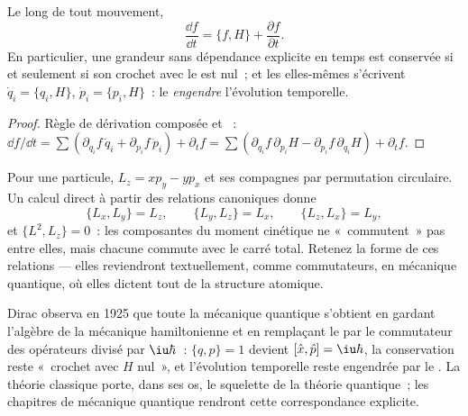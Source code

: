 \begin{theorem}\label{thm:b3:hamiltonian-mechanics:evolution}
Le long de tout mouvement,
\[
\frac{\dd f}{\dd t} = \{f, H\} + \frac{\partial f}{\partial t} .
\]
En particulier, une grandeur sans dépendance explicite en temps est
conservée si et seulement si son crochet avec le  est nul~;
et les  elles-mêmes s'écrivent $\dot q_i = \{q_i, H\}$, $\dot p_i
= \{p_i, H\}$~: le  \emph{engendre} l'évolution temporelle.
\end{theorem}

\begin{proof}
Règle de dérivation composée et ~: $\dd f/\dd t = \sum(
\partial_{q_i}f\,\dot q_i + \partial_{p_i}f\,\dot p_i) + \partial_tf =
\sum(\partial_{q_i}f\,\partial_{p_i}H - \partial_{p_i}f\,
\partial_{q_i}H) + \partial_tf$.
\end{proof}

\begin{example}\label{ex:b3:hamiltonian-mechanics:brackets}
Pour une particule, $L_z = xp_y - yp_x$ et ses compagnes par
permutation circulaire. Un calcul direct à partir des relations
canoniques donne
\[
\{L_x, L_y\} = L_z , \qquad
\{L_y, L_z\} = L_x , \qquad
\{L_z, L_x\} = L_y ,
\]
et $\{L^2, L_z\} = 0$~: les composantes du moment cinétique ne
«~commutent~» pas entre elles, mais chacune commute avec le carré
total. Retenez la forme de ces relations --- elles reviendront
textuellement, comme commutateurs, en mécanique quantique, où elles
dictent tout de la structure atomique.
\end{example}

\begin{remark}\label{rem:b3:hamiltonian-mechanics:doorway}
Dirac observa en 1925 que toute la mécanique quantique s'obtient en
gardant l'algèbre de la mécanique hamiltonienne et en remplaçant le
 par le commutateur des opérateurs divisé par
$\iu\hbar$~: $\{q, p\} = 1$ devient $[\hat x, \hat p] = \iu\hbar$, la
conservation reste «~crochet avec $H$ nul~», et l'évolution temporelle
reste engendrée par le . La théorie classique porte, dans
ses os, le squelette de la théorie quantique~; les chapitres de
mécanique quantique rendront cette correspondance explicite.
\end{remark}

